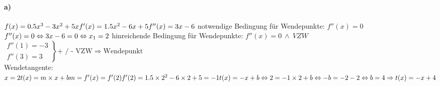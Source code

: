 \documentclass[arbeitsmappe.tex]{subfiles}
\begin{document}
    \paragraph{a)}
    $
    f(x) = 0.5x^3 - 3x^2 + 5x \\
    f'(x) = 1.5x^2 - 6x + 5 \\
    f''(x) = 3x - 6 \\
    $
    notwendige Bedingung für Wendepunkte: $f''(x) = 0$ \\
    $
    f''(x) = 0 \\
    \Leftrightarrow 3x - 6 = 0 \\
    \Leftrightarrow x_1 = 2 \\
    $
    hinreichende Bedingung für Wendepunkte: $f''(x) = 0\ \land\ VZW$ \\
    $
    \left.
    \begin{array}{l}
        f''(1) = -3 \\
        f''(3) = 3
    \end{array}
    \right\} \text{+ / - VZW} \Rightarrow \text{Wendepunkt}
    $
    \\
    Wendetangente:
    $
    x = 2 \\
    t(x) = m \times x + b \\
    m = f'(x) = f'(2) \\
    f'(2) = 1.5 \times 2^2 - 6 \times 2 + 5 = -1 \\
    t(x) = -x + b \\
    \Leftrightarrow 2 = -1 \times 2 + b \\
    \Leftrightarrow -b = -2 -2 \\
    \Leftrightarrow b = 4 \\
    \Rightarrow t(x) = -x + 4
    $
    \\
\end{document}
